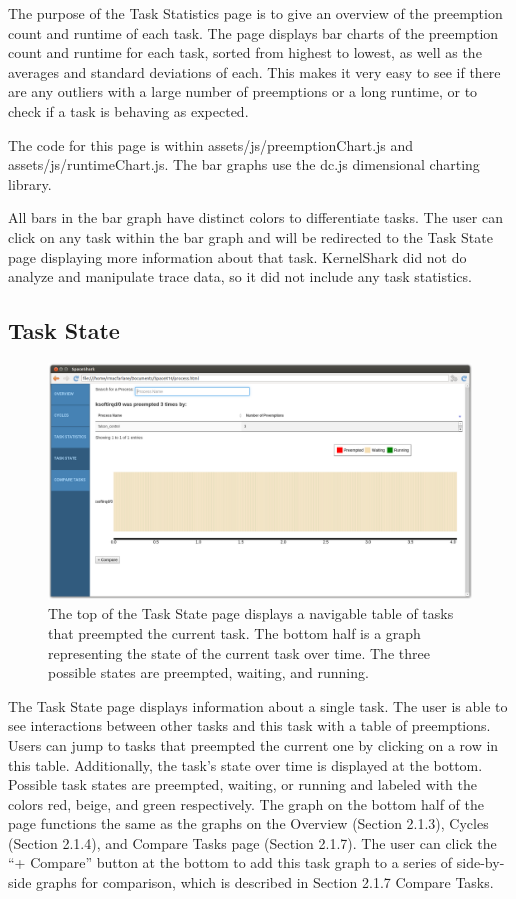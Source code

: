 \documentclass{hmcclinic}
\begin{document}
The purpose of the Task Statistics page is to give an overview of the preemption count and runtime of each task. The page displays bar charts of the preemption count and runtime for each task, sorted from highest to lowest, as well as the averages and standard deviations of each. This makes it very easy to see if there are any outliers with a large number of preemptions or a long runtime, or to check if a task is behaving as expected.

The code for this page is within assets/js/preemptionChart.js and assets/js/runtimeChart.js. The bar graphs use the dc.js dimensional charting library.

All bars in the bar graph have distinct colors to differentiate tasks. The user can click on any task within the bar graph and will be redirected to the Task State page displaying more information about that task. KernelShark did not do analyze and manipulate trace data, so it did not include any task statistics. 

  \subsection{Task State}

  \begin{figure}[H]
  \includegraphics[scale=0.25]{task-state-page.png}
  \caption{The top of the Task State page displays a navigable table of tasks
  that preempted the current task. The bottom half is a graph representing the
state of the current task over time. The three possible states are preempted,
waiting, and running.}
\end{figure}

    The Task State page displays information about a single task. The user is
    able to see interactions between other tasks and this task with a table of
    preemptions. Users can jump to tasks that preempted the current one by
    clicking on a row in this table. Additionally, the task's state over time
    is displayed at the bottom. Possible task states are preempted, waiting, or
    running and labeled with the colors red, beige, and green respectively. 
    The graph on the bottom half of the page functions the same as the graphs on the Overview (Section 2.1.3), Cycles (Section 2.1.4), and Compare Tasks page (Section 2.1.7). The user can click the ``+ Compare'' button at the bottom to add this task graph to a series of side-by-side graphs for comparison, which
    is described in Section 2.1.7 Compare Tasks.
\end{document}
